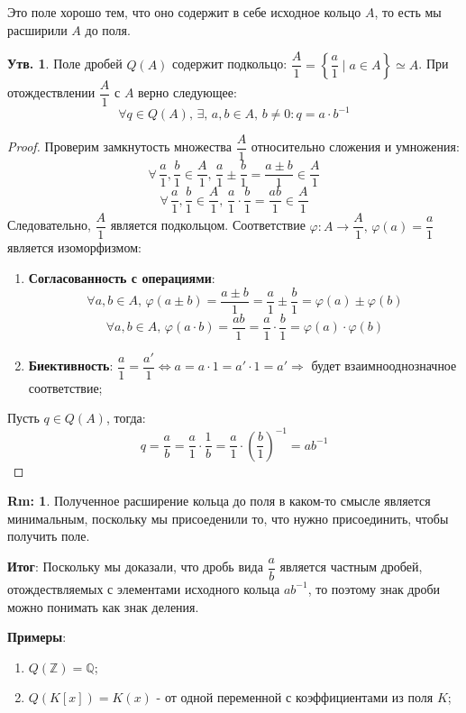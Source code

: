 \documentclass[12pt]{article}
\newcommand{\MQ}{\mathbb{Q}}
\newcommand{\MZ}{\mathbb{Z}}
\theoremstyle{definition}
\newtheorem{rem}{Rm:}
\newtheorem{prop}{Утв.}
\begin{document}
Это поле хорошо тем, что оно содержит в себе исходное кольцо $A$, то есть мы расширили $A$ до поля.
\begin{prop}
	Поле дробей $Q(A)$ содержит подкольцо: $\dfrac{A}{1} = \left\{\dfrac{a}{1} \mid a \in A\right\} \simeq A$.
	При отождествлении $\dfrac{A}{1}$ с $A$ верно следующее:
	$$
		\forall q \in Q(A), \, \exists, \, a,b\in A, \, b\neq 0 \colon q = a{\cdot}b^{-1}
	$$
\end{prop}
\begin{proof}
	Проверим замкнутость множества $\dfrac{A}{1}$ относительно сложения и умножения:
	$$
		\forall \, \dfrac{a}{1}, \dfrac{b}{1} \in \dfrac{A}{1}, \, \dfrac{a}{1} \pm \dfrac{b}{1} = \dfrac{a \pm b}{1} \in \dfrac{A}{1}
	$$
	$$
		\forall \, \dfrac{a}{1}, \dfrac{b}{1} \in \dfrac{A}{1}, \, \dfrac{a}{1}{\cdot}\dfrac{b}{1} = \dfrac{ab}{1} \in \dfrac{A}{1}
	$$
	Следовательно, $\dfrac{A}{1}$ является подкольцом. Соответствие $\varphi \colon A \to \dfrac{A}{1}, \, \varphi(a) = \dfrac{a}{1}$ является изоморфизмом:
	\begin{enumerate}[label=\arabic*)]
		\item \textbf{Согласованность с операциями}:
		$$
			\forall a,b \in A, \, \varphi(a \pm b) = \dfrac{a \pm b}{1} = \dfrac{a}{1} \pm \dfrac{b}{1} = \varphi(a) \pm \varphi(b) 
		$$
		$$
			\forall a,b \in A,\, \varphi(a{\cdot}b) = \dfrac{ab}{1} = \dfrac{a}{1}{\cdot}\dfrac{b}{1} = \varphi(a){\cdot}\varphi(b) 
		$$
		\item \textbf{Биективность}: $\dfrac{a}{1} = \dfrac{a'}{1} \Leftrightarrow a = a{\cdot}1 = a'{\cdot}1 = a' \Rightarrow$ будет взаимнооднозначное соответствие;
	\end{enumerate}

	Пусть $q \in Q(A)$, тогда: 
	$$
		q = \dfrac{a}{b} = \dfrac{a}{1}{\cdot}\dfrac{1}{b} = \dfrac{a}{1}{\cdot}\left(\dfrac{b}{1}\right)^{-1} = a b^{-1}
	$$
\end{proof}
\begin{rem}
	Полученное расширение кольца до поля в каком-то смысле является минимальным, поскольку мы присоеденили то, что нужно присоединить, чтобы получить поле.
\end{rem}
\textbf{Итог}: Поскольку мы доказали, что дробь вида $\dfrac{a}{b}$ является частным дробей, отождествляемых с элементами исходного кольца $ab^{-1}$, то поэтому знак дроби можно понимать как знак деления.

\textbf{Примеры}:
\begin{enumerate}[label=\arabic*)]
	\item $Q(\MZ) = \MQ$;
	\item $Q(K[x]) = K(x)$ -  от одной переменной с коэффициентами из поля $K$;
\end{enumerate}
\end{document}
